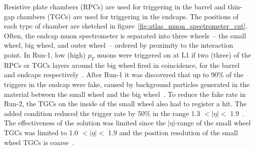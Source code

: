 Resistive plate chambers (RPCs) are used for triggering in the barrel and thin-gap chambers (TGCs) are used for triggering in the endcaps. The positions of each type of chamber are sketched in figure~\ref{fig:atlas_muon_spectrometer_cut}. Often, the endcap muon spectrometer is separated into three wheels~-- the small wheel, big wheel, and outer wheel~-- ordered by proximity to the interaction point. In Run-1, low (high) $p_T$ muons were triggered on at L1 if two (three) of the RPCs or TGCs layers around the big wheel fired in coincidence, for the barrel and endcaps respectively~\cite{atlas_l1_trigger_tdr}. After Run-1 it was discovered that up to 90\% of the triggers in the endcap were fake, caused by background particles generated in the material between the small wheel and the big wheel~\cite{nsw_tdr}.  To reduce the fake rate in Run-2, the TGCs on the inside of the small wheel also had to register a hit. The added condition reduced the trigger rate by 50\% in the range 1.3 $< |\eta| <$ 1.9~\cite{martinez_run-2_2016}. The effectiveness of the solution was limited since the $|\eta|$-range of the small wheel TGCs was limited to 1.0 $< |\eta| <$ 1.9 and the position resolution of the small wheel TGCs is coarse~\cite{nsw_tdr}.


